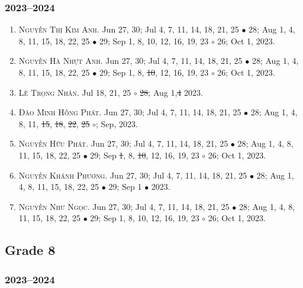 \documentclass{article}
\begin{document}
\subsubsection{2023--2024}

\begin{enumerate}
	\item \textsc{Nguyễn Thị Kim Anh.} {\sf[In]} Jun 27, 30; Jul 4, 7, 11, 14, 18, 21, 25 $\bullet$ 28; Aug 1, 4, 8, 11, 15, 18, 22, 25 $\bullet$ 29; Sep 1, 8, 10, 12, 16, 19, 23 $\circ$ 26; Oct 1, 2023.
	\item \textsc{Nguyễn Hà Nhựt Anh.} {\sf[In]} Jun 27, 30; Jul 4, 7, 11, 14, 18, 21, 25 $\bullet$ 28; Aug 1, 4, 8, 11, 15, 18, 22, 25 $\bullet$ 29; Sep 1, 8, \st{10}, 12, 16, 19, 23 $\circ$ 26; Oct 1, 2023.
	\item \textsc{Lê Trọng Nhân.} {\sf[In]} Jul 18, 21, 25 $\circ$ \st{28}; Aug 1,\st{4} 2023. \sf{[Out]}
	\item \textsc{Đào Minh Hồng Phát.} {\sf[In]} Jun 27, 30; Jul 4, 7, 11, 14, 18, 21, 25 $\bullet$ 28; Aug 1, 4, 8, 11, \st{15}, \st{18}, \st{22}, \st{25} $\circ$; Sep, 2023. \sf{[Out]}
	\item \textsc{Nguyễn Hữu Phát.} {\sf[In]} Jun 27, 30; Jul 4, 7, 11, 14, 18, 21, 25 $\bullet$ 28; Aug 1, 4, 8, 11, 15, 18, 22, 25 $\bullet$ 29; Sep \st{1}, 8, \st{10}, 12, 16, 19, 23 $\circ$ 26; Oct 1, 2023.
	\item \textsc{Nguyễn Khánh Phương.} {\sf[In]} Jun 27, 30; Jul 4, 7, 11, 14, 18, 21, 25 $\bullet$ 28; Aug 1, 4, 8, 11, 15, 18, 22, 25 $\bullet$ 29; Sep 1 $\bullet$ 2023. \sf{[Out]}
	\item \textsc{Nguyễn Như Ngọc.} {\sf[In]} Jun 27, 30; Jul 4, 7, 11, 14, 18, 21, 25 $\bullet$ 28; Aug 1, 4, 8, 11, 15, 18, 22, 25 $\bullet$ 29; Sep 1, 8, 10, 12, 16, 19, 23 $\circ$ 26; Oct 1, 2023.
\end{enumerate}


\subsection{Grade 8}

\subsubsection{2023--2024}
\end{document}
